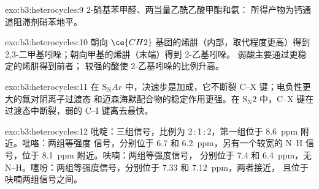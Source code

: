\begin{solution}{exo:b3:heterocycles:9}
2-硝基苯甲醛、两当量乙酰乙酸甲酯和氨：
所得产物为钙通道阻滞剂硝苯地平。
\end{solution}

\begin{solution}{exo:b3:heterocycles:10}
朝向 $\ce{CH2}$ 基团的烯肼（内部，取代程度更高）得到
2,3-二甲基吲哚；朝向甲基的烯肼（末端）得到 2-乙基吲哚。
弱酸主要通过更稳定的烯肼得到前者；
较强的酸使 2-乙基吲哚的比例升高。
\end{solution}

\begin{solution}{exo:b3:heterocycles:11}
在 $\mathrm S_\mathrm NAr$ 中，决速步是加成，它不断裂 C--X
键；电负性更大的氟对阴离子过渡态
和迈森海默配合物的稳定作用更强。在 $\mathrm S_\mathrm N2$ 中，C--X 键在
过渡态中断裂，弱的 C--I 键离去最快。
\end{solution}

\begin{solution}{exo:b3:heterocycles:12}
吡啶：三组信号，比例为 2\,:\,1\,:\,2，第一组位于 \qty{8.6}{ppm} 附近。吡咯：两组等强度
信号，分别位于 6.7 和 \qty{6.2}{ppm}，另有一个较宽的 N--H 信号，位于 \qty{8.1}{ppm} 附近。呋喃：两组等强度信号，
分别位于 7.4 和 \qty{6.4}{ppm}，无 N--H。噻吩：两组等强度信号，分别位于 7.33 和 \qty{7.12}{ppm}，两者接近，
且位于呋喃两组信号之间。
\end{solution}

